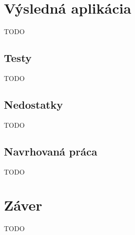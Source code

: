 \chapter{Výsledná aplikácia}
TODO

\section{Testy}
TODO

\section{Nedostatky}
TODO

\section{Navrhovaná práca}

TODO
\chapter{Záver}
TODO
